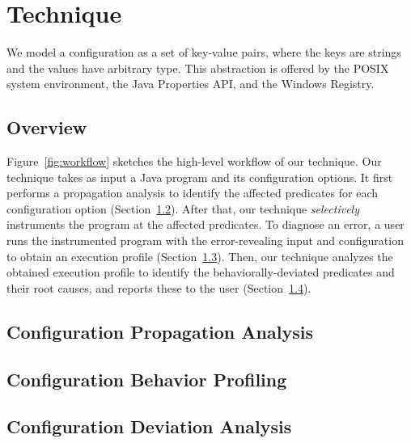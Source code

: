 \section{Technique}
\label{sec:technique}
\tinysqueeze

We model a configuration as a set of key-value pairs, where
the keys are strings and the values have arbitrary type. This
abstraction is offered
by the POSIX system environment, the Java Properties API,
and the Windows Registry.


\tinysqueeze
\subsection{Overview}
\tinysqueeze

Figure~\ref{fig:workflow} sketches the high-level workflow of our technique.
Our technique takes as input a Java program and its configuration options.
It first performs a propagation analysis to identify
the affected predicates for each configuration option (Section~\ref{sec:prop}).
After that, our technique \textit{selectively} instruments
the program at the affected predicates. 
To diagnose an error, a user runs the instrumented program
with the error-revealing input and configuration
to obtain an execution profile (Section~\ref{sec:profiling}).
Then, our technique analyzes the obtained execution profile
to identify the behaviorally-deviated predicates and their
root causes, and reports these to the user (Section~\ref{sec:analysis}).



\tinysqueeze

\subsection{Configuration Propagation Analysis}
\label{sec:prop}
\tinysqueeze


\tinysqueeze
\subsection{Configuration Behavior Profiling}
\label{sec:profiling}
\tinysqueeze



\tinysqueeze

\subsection{Configuration Deviation Analysis}
\label{sec:analysis}
\tinysqueeze




